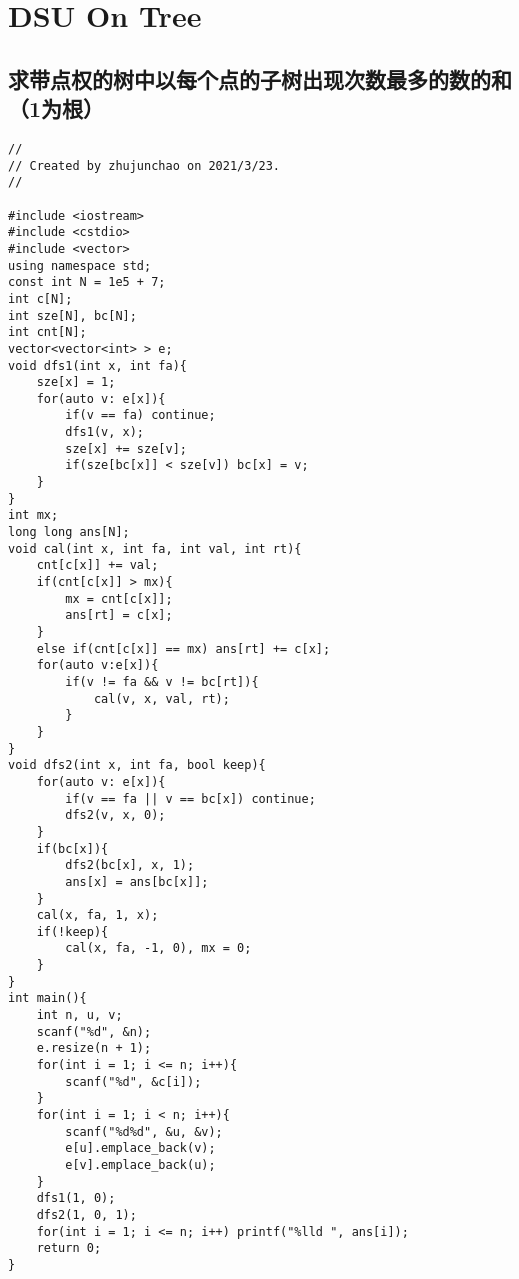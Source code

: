 \section{DSU On Tree}
\subsection{求带点权的树中以每个点的子树出现次数最多的数的和（1为根）}

\begin{lstlisting}
//
// Created by zhujunchao on 2021/3/23.
//

#include <iostream>
#include <cstdio>
#include <vector>
using namespace std;
const int N = 1e5 + 7;
int c[N];
int sze[N], bc[N];
int cnt[N];
vector<vector<int> > e;
void dfs1(int x, int fa){
    sze[x] = 1;
    for(auto v: e[x]){
        if(v == fa) continue;
        dfs1(v, x);
        sze[x] += sze[v];
        if(sze[bc[x]] < sze[v]) bc[x] = v;
    }
}
int mx;
long long ans[N];
void cal(int x, int fa, int val, int rt){
    cnt[c[x]] += val;
    if(cnt[c[x]] > mx){
        mx = cnt[c[x]];
        ans[rt] = c[x];
    }
    else if(cnt[c[x]] == mx) ans[rt] += c[x];
    for(auto v:e[x]){
        if(v != fa && v != bc[rt]){
            cal(v, x, val, rt);
        }
    }
}
void dfs2(int x, int fa, bool keep){
    for(auto v: e[x]){
        if(v == fa || v == bc[x]) continue;
        dfs2(v, x, 0);
    }
    if(bc[x]){
        dfs2(bc[x], x, 1);
        ans[x] = ans[bc[x]];
    }
    cal(x, fa, 1, x);
    if(!keep){
        cal(x, fa, -1, 0), mx = 0;
    }
}
int main(){
    int n, u, v;
    scanf("%d", &n);
    e.resize(n + 1);
    for(int i = 1; i <= n; i++){
        scanf("%d", &c[i]);
    }
    for(int i = 1; i < n; i++){
        scanf("%d%d", &u, &v);
        e[u].emplace_back(v);
        e[v].emplace_back(u);
    }
    dfs1(1, 0);
    dfs2(1, 0, 1);
    for(int i = 1; i <= n; i++) printf("%lld ", ans[i]);
    return 0;
}
\end{lstlisting}

